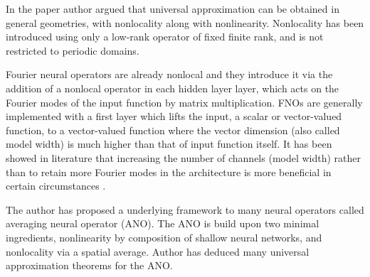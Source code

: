 \documentclass[reqno]{amsart}
\theoremstyle{plain}
\theoremstyle{definition}
\begin{document}
\noindent In the paper author argued that universal approximation can be obtained in general geometries, with nonlocality along with nonlinearity. Nonlocality has been introduced using only a low-rank operator of fixed finite rank, and is not restricted to periodic domains.

\noindent Fourier neural operators are already nonlocal and they introduce it via the addition of a nonlocal operator in each hidden layer layer, which acts on the Fourier modes of the input function by matrix multiplication. FNOs are generally implemented with a first layer which lifts the input, a scalar or vector-valued function, to a vector-valued function where the vector dimension (also called model width) is much higher than that of input function itself. It has been showed in literature that increasing the number of channels (model width) rather than to retain more Fourier modes in the architecture is more beneficial in certain circumstances \cite{SL2022}.

\noindent The author has proposed a underlying framework to many neural operators called averaging neural operator (ANO). The ANO is build upon two minimal ingredients, nonlinearity by composition of shallow neural networks, and nonlocality via a spatial average. Author has deduced many universal approximation theorems for the ANO.
\end{document}
